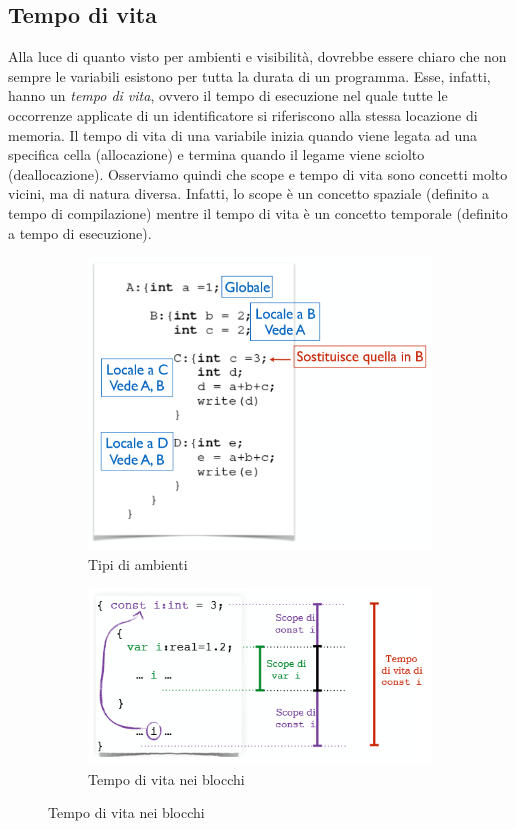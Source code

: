 \documentclass[a4paper,oneside,titlepage]{book}
\begin{document}
\subsection{Tempo di vita}
Alla luce di quanto visto per ambienti e visibilità, dovrebbe essere chiaro che non sempre le variabili esistono per tutta la durata di un programma. Esse, infatti, hanno un \textit{tempo di vita}, ovvero il tempo di esecuzione nel quale tutte le occorrenze applicate di un identificatore si riferiscono alla stessa locazione di memoria. Il tempo di vita di una variabile inizia quando viene legata ad una specifica cella (allocazione) e termina quando il legame viene sciolto (deallocazione). Osserviamo quindi che scope e tempo di vita sono concetti molto vicini, ma di natura diversa. Infatti, lo scope è un concetto spaziale (definito a tempo di compilazione) mentre il tempo di vita è un concetto temporale (definito a tempo di esecuzione).
\begin{figure}[htp]
	\begin{subfigure}{0.49\textwidth}
		\includegraphics[width=\textwidth, height=\textheight, keepaspectratio]{blocchi3.png} 
		\caption{Tipi di ambienti}
	\end{subfigure}
	\hfill
	\begin{subfigure}{0.49\textwidth}
		\includegraphics[width=\textwidth, height=\textheight, keepaspectratio]{blocchi4.png}
		\caption{Tempo di vita nei blocchi}
	\end{subfigure}
\end{figure}
\end{document}
